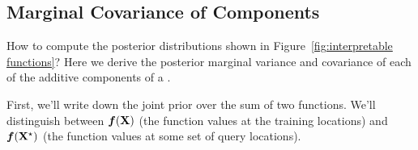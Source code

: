 \subsection{Marginal Covariance of Components}

How to compute the posterior distributions shown in Figure~\ref{fig:interpretable functions}?
Here we derive the posterior marginal variance and covariance of each of the additive components of a \gp{}.


First, we'll write down the joint prior over the sum of two functions.
We'll distinguish between $\boldsymbol{f}(\mathbf{X})$ (the function values at the training locations) and  $\boldsymbol{f}(\mathbf{X}^\star)$ (the function values at some set of query locations).

